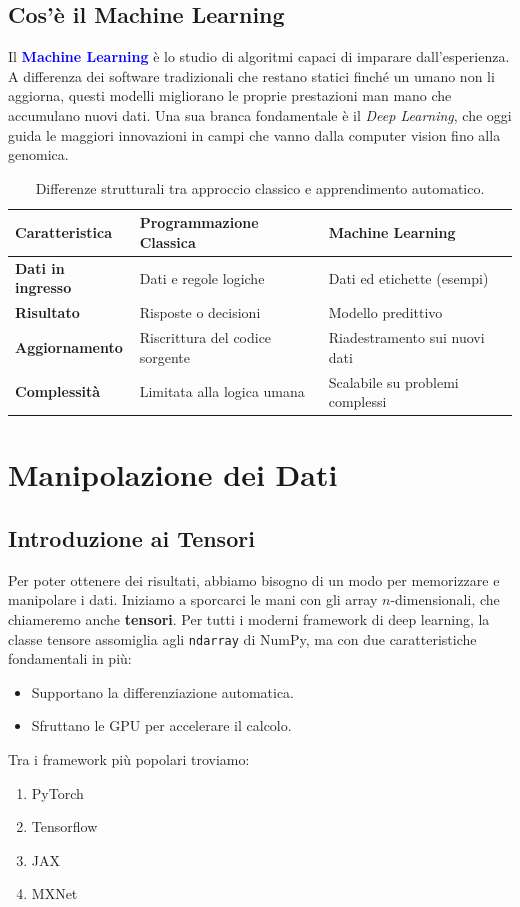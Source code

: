 \documentclass[a4paper,12pt]{report}
\newcommand{\concettoChiave}[1]{\textbf{\textcolor{blue}{#1}}}
\begin{document}
\section{Cos'è il Machine Learning}
Il \concettoChiave{Machine Learning}
è lo studio di algoritmi capaci di imparare dall'esperienza. A differenza dei software tradizionali che restano statici finché un umano non li aggiorna, questi modelli migliorano le proprie prestazioni man mano che accumulano nuovi dati. Una sua branca fondamentale è il \textit{Deep Learning}, che oggi guida le maggiori innovazioni in campi che vanno dalla computer vision fino alla genomica.

\begin{table}[H]
    \centering
    \begin{tabular}{|l|p{5.5cm}|p{5.5cm}|}
        \hline
        \textbf{Caratteristica} & \textbf{Programmazione Classica} & \textbf{Machine Learning} \\
        \hline
        \textbf{Dati in ingresso} & Dati e regole logiche & Dati ed etichette (esempi) \\
        \textbf{Risultato} & Risposte o decisioni & Modello predittivo \\
        \textbf{Aggiornamento} & Riscrittura del codice sorgente & Riadestramento sui nuovi dati \\
        \textbf{Complessità} & Limitata alla logica umana & Scalabile su problemi complessi \\
        \hline
    \end{tabular}
    \caption{Differenze strutturali tra approccio classico e apprendimento automatico.}
\end{table}


\chapter{Manipolazione dei Dati}

\section{Introduzione ai Tensori}
Per poter ottenere dei risultati, abbiamo bisogno di un modo per memorizzare e manipolare i dati. Iniziamo a sporcarci le mani con gli array $n$-dimensionali, che chiameremo anche \textbf{tensori}. 
Per tutti i moderni framework di deep learning, la classe tensore assomiglia agli \texttt{ndarray} di NumPy, ma con due caratteristiche fondamentali in più:

\begin{itemize}
    \item Supportano la differenziazione automatica.
    \item Sfruttano le GPU per accelerare il calcolo.
\end{itemize}
Tra i framework più popolari troviamo:
\begin{enumerate}
    \item PyTorch
    \item Tensorflow
    \item JAX
    \item MXNet
\end{enumerate}
\end{document}
